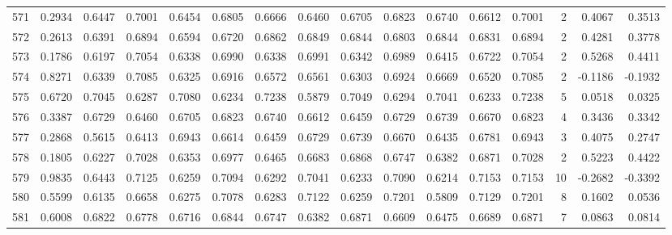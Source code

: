 \begin{tabular}{lrrrrrrrrrrrrrrr}
571 &      0.2934 &  0.6447 &  0.7001 &  0.6454 &  0.6805 &  0.6666 &  0.6460 &  0.6705 &  0.6823 &  0.6740 &   0.6612 &     0.7001 &      2 &                    0.4067 &                     0.3513 \\
572 &      0.2613 &  0.6391 &  0.6894 &  0.6594 &  0.6720 &  0.6862 &  0.6849 &  0.6844 &  0.6803 &  0.6844 &   0.6831 &     0.6894 &      2 &                    0.4281 &                     0.3778 \\
573 &      0.1786 &  0.6197 &  0.7054 &  0.6338 &  0.6990 &  0.6338 &  0.6991 &  0.6342 &  0.6989 &  0.6415 &   0.6722 &     0.7054 &      2 &                    0.5268 &                     0.4411 \\
574 &      0.8271 &  0.6339 &  0.7085 &  0.6325 &  0.6916 &  0.6572 &  0.6561 &  0.6303 &  0.6924 &  0.6669 &   0.6520 &     0.7085 &      2 &                   -0.1186 &                    -0.1932 \\
575 &      0.6720 &  0.7045 &  0.6287 &  0.7080 &  0.6234 &  0.7238 &  0.5879 &  0.7049 &  0.6294 &  0.7041 &   0.6233 &     0.7238 &      5 &                    0.0518 &                     0.0325 \\
576 &      0.3387 &  0.6729 &  0.6460 &  0.6705 &  0.6823 &  0.6740 &  0.6612 &  0.6459 &  0.6729 &  0.6739 &   0.6670 &     0.6823 &      4 &                    0.3436 &                     0.3342 \\
577 &      0.2868 &  0.5615 &  0.6413 &  0.6943 &  0.6614 &  0.6459 &  0.6729 &  0.6739 &  0.6670 &  0.6435 &   0.6781 &     0.6943 &      3 &                    0.4075 &                     0.2747 \\
578 &      0.1805 &  0.6227 &  0.7028 &  0.6353 &  0.6977 &  0.6465 &  0.6683 &  0.6868 &  0.6747 &  0.6382 &   0.6871 &     0.7028 &      2 &                    0.5223 &                     0.4422 \\
579 &      0.9835 &  0.6443 &  0.7125 &  0.6259 &  0.7094 &  0.6292 &  0.7041 &  0.6233 &  0.7090 &  0.6214 &   0.7153 &     0.7153 &     10 &                   -0.2682 &                    -0.3392 \\
580 &      0.5599 &  0.6135 &  0.6658 &  0.6275 &  0.7078 &  0.6283 &  0.7122 &  0.6259 &  0.7201 &  0.5809 &   0.7129 &     0.7201 &      8 &                    0.1602 &                     0.0536 \\
581 &      0.6008 &  0.6822 &  0.6778 &  0.6716 &  0.6844 &  0.6747 &  0.6382 &  0.6871 &  0.6609 &  0.6475 &   0.6689 &     0.6871 &      7 &                    0.0863 &                     0.0814 \\

\end{tabular}
